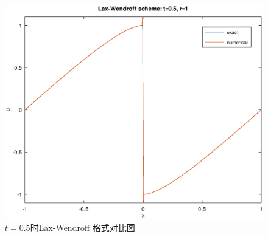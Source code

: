 \documentclass[a4paper, 12pt]{amsart}
\numberwithin{equation}{section}
\begin{document}
\begin{figure}[htbp]\centering
\includegraphics[width=\textwidth]{Lax-Wendroff.eps}
\caption{$t=0.5$时Lax-Wendroff 格式对比图}
\end{figure}
\end{document}
